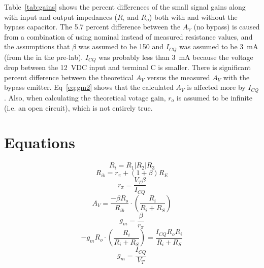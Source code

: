 Table~\ref{tab:gains} shows the percent differences of the small signal gains along with input and output impedances ($R_i$ and $R_o$) both with and without the bypass capacitor. The 5.7 percent difference between the $A_V$ (no bypass) is caused from a combination of using nominal instead of measured resistance values, and the assumptions that $\beta$ was assumed to be 150 and  $I_{CQ}$ was assumed to be \SI{3}{mA} (from the in the pre-lab). $I_{CQ}$ was probably less than \SI{3}{mA} because the voltage drop between the \SI{12}{VDC} input and terminal C is smaller. There is significant percent difference between the theoretical $A_V$ versus the measured $A_V$ with the bypass emitter. Eq~\ref{eq:gm2} shows that the calculated $A_V$ is affected more by $I_{CQ}$. Also, when calculating the theoretical votage gain, $r_o$ is assumed to be infinite (i.e. an open circuit), which is not entirely true. %


\section{Equations}

%
\begin{equation}
  \label{eq:Ri}
  R_i = R_1 | R_2 | R_3
\end{equation}
%
\begin{equation}
  \label{eq:Rib}
  R_{ib} = r_\pi + (1+\beta) R_E
\end{equation}
%
\begin{equation}
  \label{eq:rpi}
  r_\pi = \frac{V_T\beta}{I_{CQ}}
\end{equation}
%
\begin{equation}
  \label{eq:Av1}
  A_V = \frac{-\beta R_o}{R_{ib}} \cdot \left( \frac{R_i}{R_i + R_S} \right)
\end{equation}
%
\begin{equation}
  \label{eq:gm1}
  g_m = \frac{\beta}{r_\pi}
\end{equation}
%
\begin{equation}
  \label{eq:Av2}
  -g_mR_o \cdot \left(\frac{R_i}{R_i + R_S} \right) = \frac{I_{CQ}R_oR_i}{R_i + R_S}
\end{equation}
%
\begin{equation}
  \label{eq:gm2}
  g_m = \frac{I_{CQ}}{V_T}
\end{equation}


